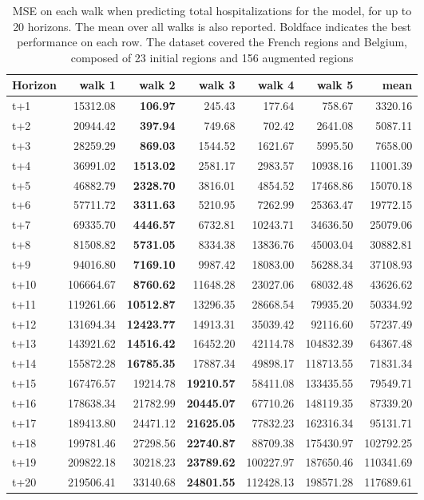 \begin{table}[H]
\centering
\caption{MSE on each walk when predicting total hospitalizations for the model, for up to 20 horizons. The mean over all walks is also reported. Boldface indicates the best performance on each row. The dataset covered the French regions and Belgium, composed of 23 initial regions and 156 augmented regions }
\label{tab:MSE_walk_baseline}
\begin{tabular}{lrrrrrr}
\toprule
Horizon &    walk 1 &   walk 2 &   walk 3 &    walk 4 &    walk 5 &      mean \\
\midrule
t+1  & 15312.08  & \textbf{106.97}  & 245.43  & 177.64  & 758.67  & 3320.16  \\
t+2  & 20944.42  & \textbf{397.94}  & 749.68  & 702.42  & 2641.08  & 5087.11  \\
t+3  & 28259.29  & \textbf{869.03}  & 1544.52  & 1621.67  & 5995.50  & 7658.00  \\
t+4  & 36991.02  & \textbf{1513.02}  & 2581.17  & 2983.57  & 10938.16  & 11001.39  \\
t+5  & 46882.79  & \textbf{2328.70}  & 3816.01  & 4854.52  & 17468.86  & 15070.18  \\
t+6  & 57711.72  & \textbf{3311.63}  & 5210.95  & 7262.99  & 25363.47  & 19772.15  \\
t+7  & 69335.70  & \textbf{4446.57}  & 6732.81  & 10243.71  & 34636.50  & 25079.06  \\
t+8  & 81508.82  & \textbf{5731.05}  & 8334.38  & 13836.76  & 45003.04  & 30882.81  \\
t+9  & 94016.80  & \textbf{7169.10}  & 9987.42  & 18083.00  & 56288.34  & 37108.93  \\
t+10  & 106664.67  & \textbf{8760.62}  & 11648.28  & 23027.06  & 68032.48  & 43626.62  \\
t+11  & 119261.66  & \textbf{10512.87}  & 13296.35  & 28668.54  & 79935.20  & 50334.92  \\
t+12  & 131694.34  & \textbf{12423.77}  & 14913.31  & 35039.42  & 92116.60  & 57237.49  \\
t+13  & 143921.62  & \textbf{14516.42}  & 16452.20  & 42114.78  & 104832.39  & 64367.48  \\
t+14  & 155872.28  & \textbf{16785.35}  & 17887.34  & 49898.17  & 118713.55  & 71831.34  \\
t+15  & 167476.57  & 19214.78  & \textbf{19210.57}  & 58411.08  & 133435.55  & 79549.71  \\
t+16  & 178638.34  & 21782.99  & \textbf{20445.07}  & 67710.26  & 148119.35  & 87339.20  \\
t+17  & 189413.80  & 24471.12  & \textbf{21625.05}  & 77832.23  & 162316.34  & 95131.71  \\
t+18  & 199781.46  & 27298.56  & \textbf{22740.87}  & 88709.38  & 175430.97  & 102792.25  \\
t+19  & 209822.18  & 30218.23  & \textbf{23789.62}  & 100227.97  & 187650.46  & 110341.69  \\
t+20  & 219506.41  & 33140.68  & \textbf{24801.55}  & 112428.13  & 198571.28  & 117689.61  \\

\bottomrule
\end{tabular}
\end{table}
